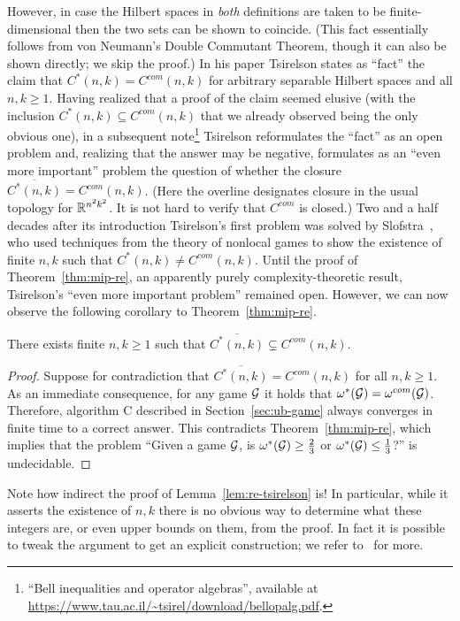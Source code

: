 However, in case the Hilbert spaces in \emph{both} definitions are taken to be finite-dimensional then the two sets can be shown to coincide. (This fact essentially follows from von Neumann's Double Commutant Theorem, though it can also be shown directly; we skip the proof.)
In his paper Tsirelson states as ``fact'' the claim that $C^*(n,k)=C^{com}(n,k)$ for arbitrary separable Hilbert spaces and all $n,k\geq 1$. Having realized that a proof of the claim seemed elusive (with the inclusion $C^*(n,k)\subseteq C^{com}(n,k)$ that we already observed being the only obvious one), in a subsequent note\footnote{``Bell inequalities and operator algebras'', available at \url{https://www.tau.ac.il/~tsirel/download/bellopalg.pdf}.} Tsirelson reformulates the ``fact'' as an open problem and, realizing that the answer may be negative, formulates as an ``even more important'' problem the question of whether the closure $\overline{C^*(n,k)}=C^{com}(n,k)$. (Here the overline designates closure in the usual topology for $\mathbb{R}^{n^2k^2}$. It is not hard to verify that $C^{com}$ is closed.) Two and a half decades after its introduction Tsirelson's first problem was solved by Slofstra~\cite{slofstra2019set}, who used techniques from the theory of nonlocal games to show the existence of finite $n,k$ such that $C^*(n,k)\neq C^{com}(n,k)$. Until the proof of Theorem~\ref{thm:mip-re}, an apparently purely complexity-theoretic result, Tsirelson's ``even more important problem'' remained open. However, we can now observe the following corollary to Theorem~\ref{thm:mip-re}. 

\begin{corollary}\label{lem:re-tsirelson}
There exists finite $n,k\geq 1$ such that  $\overline{C^*(n,k)}\subsetneq C^{com}(n,k)$. 
\end{corollary} 

\begin{proof}
Suppose for contradiction that $\overline{C^*(n,k)}= C^{com}(n,k)$ for all $n,k\geq 1$. As an immediate consequence, for any game $\mathcal{G}$ it holds that $\omega^*(\mathcal{G}) = \omega^{com}(\mathcal{G})$. Therefore, algorithm C described in Section~\ref{sec:ub-game} always converges in finite time to a correct answer. This contradicts Theorem~\ref{thm:mip-re}, which implies that the problem ``Given a game $\mathcal{G}$, is $\omega^*(\mathcal{G}) \geq \frac{2}{3}$ or $\omega^*(\mathcal{G}) \leq \frac{1}{3}$?'' is undecidable.
\end{proof}

Note how indirect the proof of Lemma~\ref{lem:re-tsirelson} is! In particular, while it asserts the existence of $n,k$ there is no obvious way to determine what these integers are, or even upper bounds on them, from the proof. In fact it is possible to tweak the argument to get an explicit construction; we refer to~\cite{ji2021mip} for more. 


